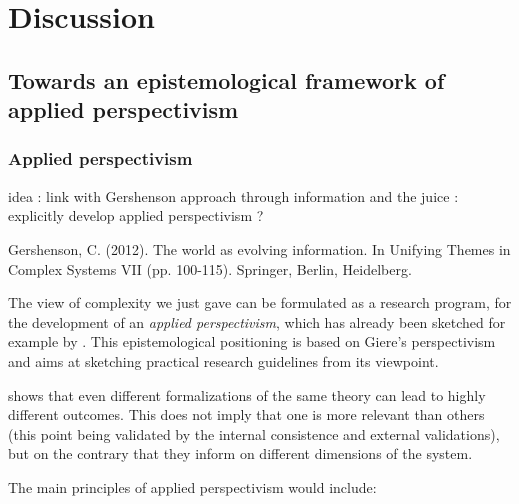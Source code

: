 \section{Discussion}


\subsection{Towards an epistemological framework of applied perspectivism}

\subsubsection{Applied perspectivism}

idea : link with Gershenson approach through information and the juice : explicitly develop applied perspectivism ?

Gershenson, C. (2012). The world as evolving information. In Unifying Themes in Complex Systems VII (pp. 100-115). Springer, Berlin, Heidelberg.

\cite{gershenson2012world}


The view of complexity we just gave can be formulated as a research program, for the development of an \emph{applied perspectivism}, which has already been sketched for example by \cite{2018arXiv180807282B}. This epistemological positioning is based on Giere's perspectivism \cite{giere2010scientific} and aims at sketching practical research guidelines from its viewpoint.

\cite{muelder2018} shows that even different formalizations of the same theory can lead to highly different outcomes. This does not imply that one is more relevant than others (this point being validated by the internal consistence and external validations), but on the contrary that they inform on different dimensions of the system.




The main principles of applied perspectivism would include:


